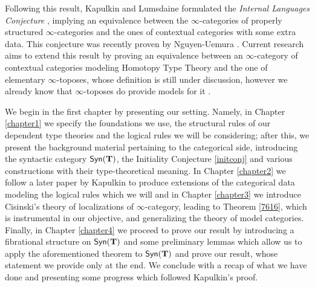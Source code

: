 \noindent
Following this result, Kapulkin and Lumsdaine formulated the \emph{Internal
Languages Conjecture} \cite[Conj.\ 3.7]{KL16}, implying an equivalence between
the $\infty$-categories of properly structured $\infty$-categories and the ones
of contextual categories with some extra data. This conjecture
was recently proven by Nguyen-Uemura \cite{NU22}. Current research aims to
extend this result by proving an equivalence between an $\infty$-category of
contextual categories modeling Homotopy Type Theory and the one of elementary
$\infty$-toposes, whose definition is still under discussion, however we already
know that $\infty$-toposes do provide models for it \cite{Shu19}.

\begin{organization}
  We begin in the first chapter by presenting our setting. Namely, in
  Chapter \ref{chapter1} we specify the foundations we use, the structural rules of our
  dependent type theories and the logical rules we will be considering; after
  this, we present the background material pertaining to the categorical side,
  introducing the syntactic category $\mathsf{Syn}(\mathbf{T})$, the Initiality Conjecture
  \ref{initconj} and various constructions
  with their type-theoretical meaning. In Chapter \ref{chapter2} we follow
  a later paper by Kapulkin \cite{Kap17} to produce
  extensions of the categorical data modeling the logical rules which we will
  and in Chapter
  \ref{chapter3} we introduce Cisinski's theory of localizations of
  $\infty$-category, leading to Theorem \ref{7616}, which is instrumental in our
  objective, and generalizing the theory of model categories. Finally, in
  Chapter \ref{chapter4} we proceed to prove our result by introducing a
  fibrational structure on $\mathsf{Syn}(\mathbf{T})$ \cite{AKL15} and some preliminary lemmas
  which allow us
  to apply the aforementioned theorem to $\mathsf{Syn}(\mathbf{T})$ and prove our result,
  whose statement we provide only at the end. We conclude with a
  recap of what we have done and presenting some progress which followed
  Kapulkin's proof.
\end{organization}
